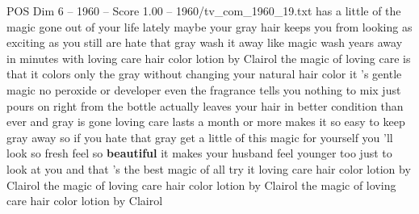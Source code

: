\begin{textsample}{POS Dim 6 – 1960 – Score 1.00 – 1960/tv\_com\_1960\_19.txt}  \label{ex:f6_pos_025}
has a little of the magic gone out of your life lately maybe your gray hair keeps you from looking as exciting as you still are hate that gray wash it away like magic wash years away in minutes with loving care hair color lotion by Clairol the magic of loving care is that it colors only the gray without changing your natural hair color it 's gentle magic no peroxide or developer even the fragrance tells you nothing to mix just pours on right from the bottle actually leaves your hair in better condition than ever and gray is gone loving care lasts a month or more makes it so easy to keep gray away so if you hate that gray get a little of this magic for yourself you 'll look so fresh feel so \textbf{beautiful} it makes your husband feel younger too just to look at you and that 's the best magic of all try it loving care hair color lotion by Clairol the magic of loving care hair color lotion by Clairol the magic of loving care hair color lotion by Clairol

\end{textsample}

